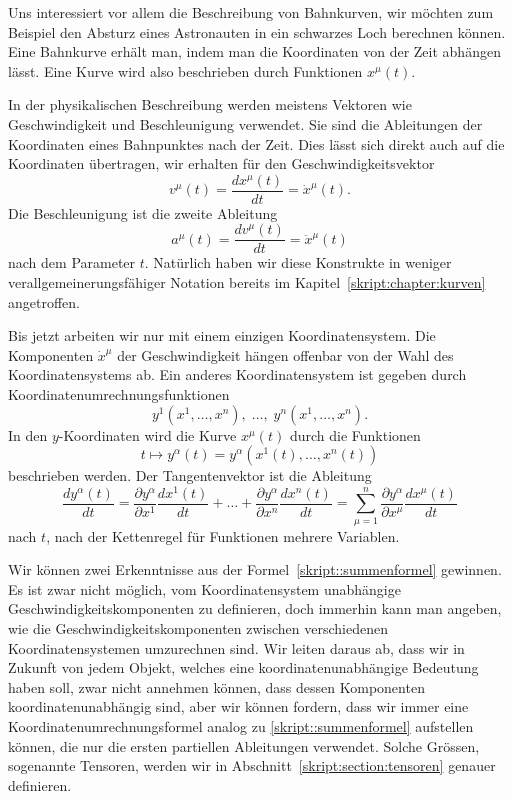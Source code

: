 Uns interessiert vor allem die Beschreibung von Bahnkurven, wir möchten
zum Beispiel den Absturz eines Astronauten in ein schwarzes Loch berechnen
%
%
können.
Eine Bahnkurve erhält man, indem man die Koordinaten von der Zeit
abhängen lässt.
Eine Kurve wird also beschrieben durch Funktionen $x^\mu(t)$.

In der physikalischen Beschreibung werden meistens Vektoren wie
Geschwindigkeit und Beschleunigung verwendet.
Sie sind die Ableitungen der Koordinaten eines Bahnpunktes nach
der Zeit.
Dies lässt sich direkt auch auf die Koordinaten übertragen,
wir erhalten für den Geschwindigkeitsvektor
\[
v^{\mu}(t) = \frac{dx^\mu(t)}{dt} = \dot x^\mu(t).
\]
Die Beschleunigung ist die zweite Ableitung
\[
a^\mu(t)
=
\frac{dv^\mu(t)}{dt}
=
\ddot x^\mu(t)
\]
nach dem Parameter $t$.
Natürlich haben wir diese Konstrukte in weniger verallgemeinerungsfähiger
Notation bereits im Kapitel~\ref{skript:chapter:kurven} angetroffen.

Bis jetzt arbeiten wir nur mit einem einzigen Koordinatensystem.
Die Komponenten $\dot x^\mu$ der Geschwindigkeit hängen offenbar
von der Wahl des Koordinatensystems ab.
Ein anderes Koordinatensystem ist gegeben durch
Koordinatenumrechnungsfunktionen
\[
y^1(x^1,\dots,x^n),\;\dots,\;y^n(x^1,\dots,x^n).
\]
In den $y$-Koordinaten wird die Kurve $x^\mu(t)$ durch die Funktionen
\[
t\mapsto y^\alpha(t)=y^\alpha(x^1(t),\dots,x^n(t))
\]
beschrieben werden.
Der Tangentenvektor ist die Ableitung 
%
\begin{equation}
\frac{dy^\alpha(t)}{dt}
=
\frac{\partial y^\alpha}{\partial x^1}\frac{dx^1(t)}{dt}
+\dots+
\frac{\partial y^\alpha}{\partial x^n}\frac{dx^n(t)}{dt}
=
\sum_{\mu=1}^n
\frac{\partial y^\alpha}{\partial x^\mu}\frac{dx^\mu(t)}{dt}
\label{skript::summenformel}
\end{equation}
nach $t$, nach der Kettenregel für Funktionen mehrere Variablen.
%

Wir können zwei Erkenntnisse aus der Formel~\eqref{skript::summenformel}
gewinnen.
Es ist zwar nicht möglich, vom Koordinatensystem unabhängige
Geschwindigkeitskomponenten zu definieren, doch immerhin kann man
angeben, wie die Geschwindigkeitskomponenten zwischen verschiedenen
Koordinatensystemen umzurechnen sind.
Wir leiten daraus ab, dass wir in Zukunft von jedem Objekt, welches
eine koordinatenunabhängige Bedeutung haben soll, zwar nicht
annehmen können, dass dessen Komponenten koordinatenunabhängig sind,
aber wir können fordern, dass wir immer eine Koordinatenumrechnungsformel
analog zu \eqref{skript::summenformel} aufstellen können, die nur die
ersten partiellen Ableitungen verwendet.
Solche Grössen, sogenannte Tensoren, werden wir in
Abschnitt~\ref{skript:section:tensoren} genauer definieren.

